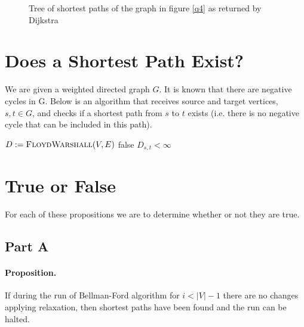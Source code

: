 \documentclass{article}
\begin{document}
\begin{figure}[htbp]
	\centering
	\caption{Tree of shortest paths of the graph in figure \ref{q4} as returned by Dijkstra}
	\label{q4-tree}
\end{figure}

\section{Does a Shortest Path Exist?}

We are given a weighted directed graph \(G\). It is known that there are negative cycles in G. Below is an algorithm that receives source and target vertices, \(s, t \in G\), and checks if a shortest path from \(s\) to \(t\) exists (i.e. there is no negative cycle that can be included in this path).

\begin{algorithm}
	\begin{algorithmic}
		\State \(D := \Call{FloydWarshall}{V, E}\)
		 
		 
		\State \Return false
		\EndIf
		\EndIf
		\EndFor
		\State \Return \(D_{s,t} < \infty\) 
		\EndFunction
	\end{algorithmic}
\end{algorithm}

\section{True or False}

For each of these propositions we are to determine whether or not they are true.

\subsection*{Part A}

\paragraph{Proposition.} If during the run of Bellman-Ford algorithm for \(i < |V| - 1\) there are no changes applying relaxation, then shortest paths have been found and the run can be halted.
\end{document}
